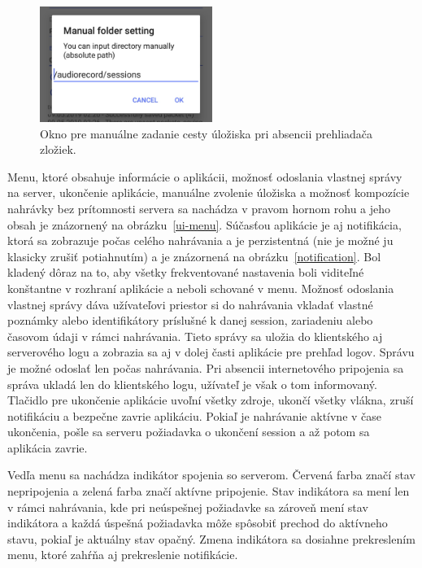 \begin{figure}[hbt]
	\centering
	\includegraphics[width=0.5\textwidth]{obrazky-figures/ui-directory-chooser.png}
	\caption{Okno pre manuálne zadanie cesty úložiska pri absencii prehliadača zložiek.}
	\label{ui-directory-chooser}
\end{figure}

Menu, ktoré obsahuje informácie o aplikácii, možnosť odoslania vlastnej správy na server, ukončenie aplikácie, manuálne zvolenie úložiska a možnosť kompozície nahrávky bez prítomnosti servera sa nachádza v pravom hornom rohu a jeho obsah je znázornený na obrázku~\ref{ui-menu}. Súčasťou aplikácie je aj notifikácia, ktorá sa zobrazuje počas celého nahrávania a je perzistentná (nie je možné ju klasicky zrušiť potiahnutím) a je znázornená na obrázku~\ref{notification}. Bol kladený dôraz na to, aby všetky frekventované nastavenia boli viditeľné konštantne v rozhraní aplikácie a neboli schované v menu. Možnosť odoslania vlastnej správy dáva užívateľovi priestor si do nahrávania vkladať vlastné poznámky alebo identifikátory príslušné k danej session, zariadeniu alebo časovom údaji v rámci nahrávania. Tieto správy sa uložia do klientského aj serverového logu a zobrazia sa aj v dolej časti aplikácie pre prehľad logov. Správu je možné odoslať len počas nahrávania. Pri absencii internetového pripojenia sa správa ukladá len do klientského logu, užívateľ je však o tom informovaný. Tlačidlo pre ukončenie aplikácie uvoľní všetky zdroje, ukončí všetky vlákna, zruší notifikáciu a bezpečne zavrie aplikáciu. Pokiaľ je nahrávanie aktívne v čase ukončenia, pošle sa serveru požiadavka o ukončení session a až potom sa aplikácia zavrie.

Vedľa menu sa nachádza indikátor spojenia so serverom. Červená farba značí stav nepripojenia a zelená farba značí aktívne pripojenie. Stav indikátora sa mení len v rámci nahrávania, kde pri neúspešnej požiadavke sa zároveň mení stav indikátora a každá úspešná požiadavka môže spôsobiť prechod do aktívneho stavu, pokiaľ je aktuálny stav opačný. Zmena indikátora sa dosiahne prekreslením menu, ktoré zahŕňa aj prekreslenie notifikácie. 

